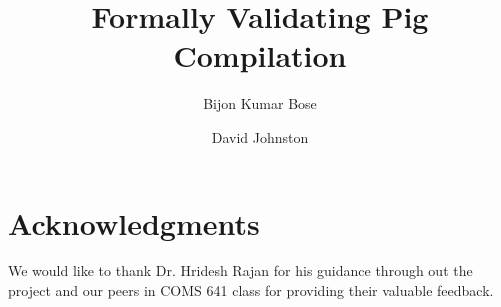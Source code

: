 \documentclass{llncs}
\begin{document}
\title{Formally Validating Pig Compilation}

\author{Bijon Kumar Bose \and David Johnston}
%

\maketitle

\begin{abstract}

\end{abstract}








\section{Acknowledgments}
We would like to thank Dr. Hridesh Rajan for his guidance through out the project and our peers in COMS 641 class for providing their valuable feedback.




\end{document}
